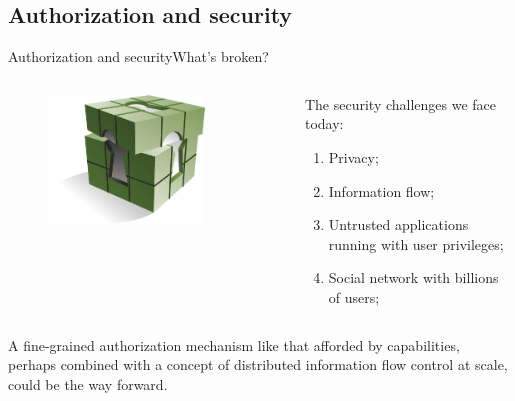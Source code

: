 \documentclass[10pt]{beamer}
\begin{document}
\subsection{Authorization and security}
\begin{frame}{Authorization and security}{What's broken?}
  \begin{columns}[T]
    \begin{column}{.3\textwidth}
      \begin{figure}[ht]
        \centering
        \includegraphics[width=0.8\textwidth, keepaspectratio=true]{images/authorization.png}
      \end{figure}
    \end{column}

    \hfill
    \begin{column}{.7\textwidth}
      \begin{block}{}
        The security challenges we face today:
      \end{block} \pause

      \begin{enumerate}
        \item Privacy; \pause
        \item Information flow; \pause
        \item Untrusted applications running with user privileges; \pause
        \item Social network with billions of users;
      \end{enumerate}
     \end{column}
  \end{columns}

  \begin{block}{}
    A fine-grained authorization mechanism like that afforded by capabilities,
    perhaps combined with a concept of distributed information flow control
    at scale, could be the way forward.
  \end{block}
\end{frame}
\end{document}

